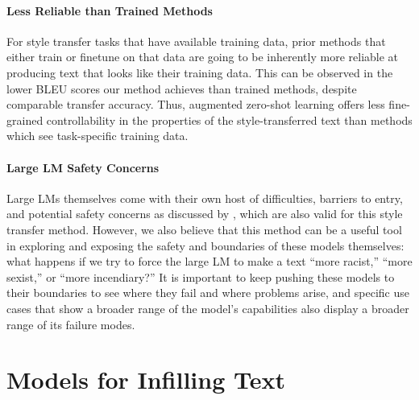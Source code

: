 \paragraph{Less Reliable than Trained Methods}
For style transfer tasks that have available training data, prior methods that either train or finetune on that data are going to be inherently more reliable at producing text that looks like their training data.
This can be observed in the lower BLEU scores our method achieves than trained methods, despite comparable transfer accuracy.
Thus, augmented zero-shot learning offers less fine-grained controllability in the properties of the style-transferred text than methods which see task-specific training data.

\paragraph{Large LM Safety Concerns} Large LMs themselves come with their own host of difficulties, barriers to entry, and potential safety concerns as discussed by \citet{bender2021stochastic}, which are also valid for this style transfer method. However, we also believe that this method can be a useful tool in exploring and exposing the safety and boundaries of these models themselves: what happens if we try to force the large LM to make a text ``more racist,'' ``more sexist,'' or ``more incendiary?'' It is important to keep pushing these models to their boundaries to see where they fail and where problems arise, and specific use cases that show a broader range of the model's capabilities also display a broader range of its failure modes.



\section{Models for Infilling Text}
\label{section:fitb}


